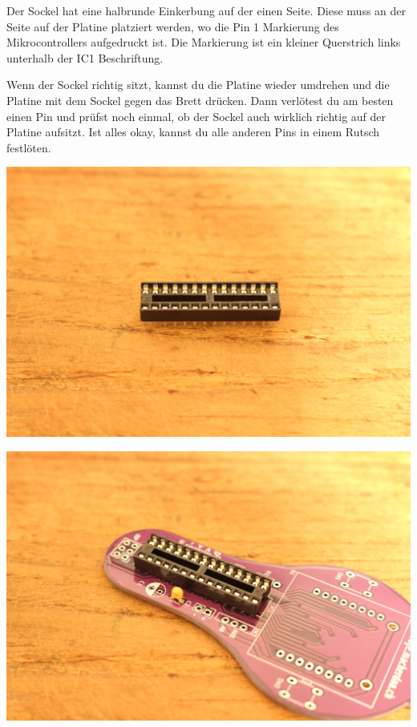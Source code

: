 \documentclass{article}
\begin{document}
Der Sockel hat eine halbrunde Einkerbung auf der einen Seite. Diese muss an der Seite auf der Platine platziert werden, wo die Pin 1 Markierung des Mikrocontrollers aufgedruckt ist. Die Markierung ist ein kleiner Querstrich links unterhalb der IC1 Beschriftung.

Wenn der Sockel richtig sitzt, kannst du die Platine wieder umdrehen und die Platine mit dem Sockel gegen das Brett drücken. Dann verlötest du am besten einen Pin und prüfst noch einmal, ob der Sockel auch wirklich richtig auf der Platine aufsitzt. Ist alles okay, kannst du alle anderen Pins in einem Rutsch festlöten.

\vspace{1cm}

\begin{minipage}[b]{0.5\textwidth}
	\includegraphics[width=\textwidth]{Bilder2024/IMG_0040.JPG}
\end{minipage}
\begin{minipage}[b]{0.5\textwidth}
	\includegraphics[width=\textwidth]{Bilder2024/IMG_0041.JPG}
\end{minipage}
\end{document}
